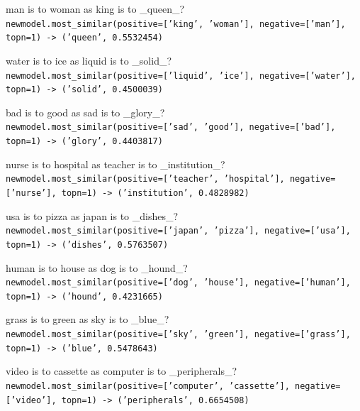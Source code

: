 \documentclass[
	letterpaper, %
]{jdf}
\begin{document}
\vspace{1em}

man is to woman as king is to \_queen\_?\\
\texttt{newmodel.most\_similar(positive=['king', 'woman'], negative=['man'], topn=1) -> ('queen', 0.5532454)}

\vspace{1em}

water is to ice as liquid is to \_solid\_?\\
\texttt{newmodel.most\_similar(positive=['liquid', 'ice'], negative=['water'], topn=1) -> ('solid', 0.4500039)}

\vspace{1em}

bad is to good as sad is to \_glory\_?\\
\texttt{newmodel.most\_similar(positive=['sad', 'good'], negative=['bad'], topn=1) -> ('glory', 0.4403817)}

\vspace{1em}

nurse is to hospital as teacher is to \_institution\_?\\
\texttt{newmodel.most\_similar(positive=['teacher', 'hospital'], negative=['nurse'], topn=1) -> ('institution', 0.4828982)}

\vspace{1em}

usa is to pizza as japan is to \_dishes\_?\\
\texttt{newmodel.most\_similar(positive=['japan', 'pizza'], negative=['usa'], topn=1) -> ('dishes', 0.5763507)}

\vspace{1em}

human is to house as dog is to \_hound\_?\\
\texttt{newmodel.most\_similar(positive=['dog', 'house'], negative=['human'], topn=1) -> ('hound', 0.4231665)}

\vspace{1em}

grass is to green as sky is to \_blue\_?\\
\texttt{newmodel.most\_similar(positive=['sky', 'green'], negative=['grass'], topn=1) -> ('blue', 0.5478643)}

\vspace{1em}

video is to cassette as computer is to \_peripherals\_?\\
\texttt{newmodel.most\_similar(positive=['computer', 'cassette'], negative=['video'], topn=1) -> ('peripherals', 0.6654508)}
\end{document}

